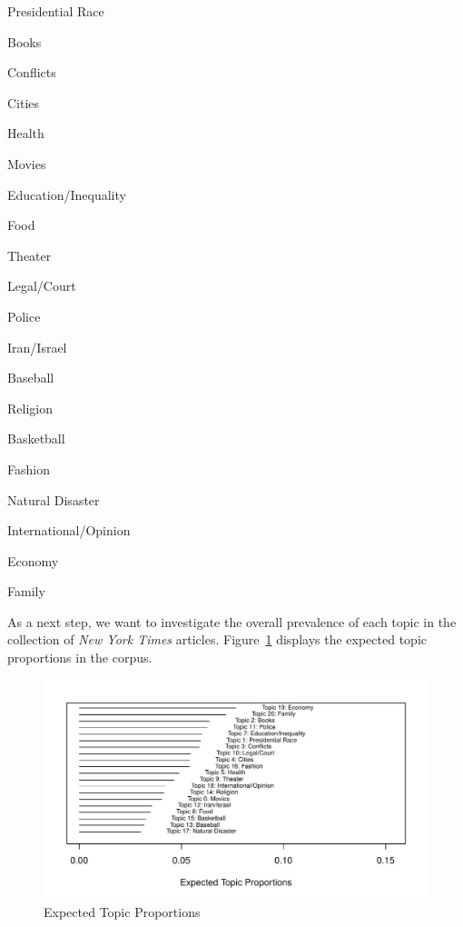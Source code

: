 \documentclass[12pt]{article}
\begin{document}
\begin{doublespace}
\begin{enumerate}\singlespacing
\begin{multicols}{2}
\item Presidential Race \item Books \item Conflicts \item Cities  \item Health
\item Movies \item Education/Inequality \item Food \item Theater \item Legal/Court
\columnbreak
\item Police \item Iran/Israel \item Baseball \item Religion \item Basketball
\item Fashion \item Natural Disaster \item International/Opinion \item Economy \item Family
\end{multicols}
\end{enumerate}

As a next step, we want to investigate the overall prevalence of each topic in the collection of \textit{New York Times} articles. Figure~\ref{fig:prop} displays the expected topic proportions in the corpus.

\begin{figure}
\caption{Expected Topic Proportions}\label{fig:prop}
\includegraphics[width=\textwidth]{../calc/fig/prop}
\end{figure}


\end{doublespace}
\end{document}
